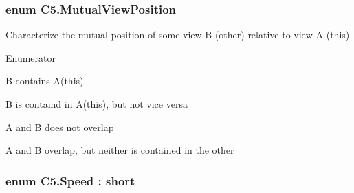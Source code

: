 \subsubsection[{Mutual\+View\+Position}]{\setlength{\rightskip}{0pt plus 5cm}enum {\bf C5.\+Mutual\+View\+Position}\hspace{0.3cm}{\ttfamily [strong]}}\label{namespace_c5_a93460c84ab30d45612d93f6dd739f2f5}


Characterize the mutual position of some view B (other) relative to view A (this) 

\begin{Desc}
\item[Enumerator]\par
\begin{description}
\item[{\em 
\hypertarget{namespace_c5_a93460c84ab30d45612d93f6dd739f2f5ab270372be5b4433b4736daaf25e1c74e}{}Contains\label{namespace_c5_a93460c84ab30d45612d93f6dd739f2f5ab270372be5b4433b4736daaf25e1c74e}
}]B contains A(this) \item[{\em 
\hypertarget{namespace_c5_a93460c84ab30d45612d93f6dd739f2f5ac884e0f8af570938d791c4cdd795aabb}{}Contained\+In\label{namespace_c5_a93460c84ab30d45612d93f6dd739f2f5ac884e0f8af570938d791c4cdd795aabb}
}]B is containd in A(this), but not vice versa \item[{\em 
\hypertarget{namespace_c5_a93460c84ab30d45612d93f6dd739f2f5a8172d30fe7e15e881ee3508a705e58e4}{}Non\+Overlapping\label{namespace_c5_a93460c84ab30d45612d93f6dd739f2f5a8172d30fe7e15e881ee3508a705e58e4}
}]A and B does not overlap \item[{\em 
\hypertarget{namespace_c5_a93460c84ab30d45612d93f6dd739f2f5ac309128476f539aaa98e2de4e5380c7f}{}Overlapping\label{namespace_c5_a93460c84ab30d45612d93f6dd739f2f5ac309128476f539aaa98e2de4e5380c7f}
}]A and B overlap, but neither is contained in the other \end{description}
\end{Desc}
\hypertarget{namespace_c5_a615ba88dcdaa8d5a3c5f833a73d7fad6}{}
\subsubsection[{Speed}]{\setlength{\rightskip}{0pt plus 5cm}enum {\bf C5.\+Speed} \+: short\hspace{0.3cm}{\ttfamily [strong]}}\label{namespace_c5_a615ba88dcdaa8d5a3c5f833a73d7fad6}


